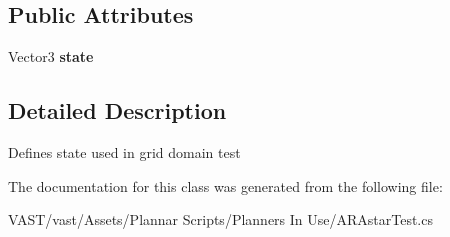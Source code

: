 \subsection*{Public Attributes}
\begin{DoxyCompactItemize}
\item 
\hypertarget{class_a_r_astar_state_ae03c113a1d3d2e42ec3b4ee12a9c0ba8}{Vector3 {\bfseries state}}\label{class_a_r_astar_state_ae03c113a1d3d2e42ec3b4ee12a9c0ba8}

\end{DoxyCompactItemize}


\subsection{Detailed Description}
Defines state used in grid domain test 

The documentation for this class was generated from the following file\-:\begin{DoxyCompactItemize}
\item 
V\-A\-S\-T/vast/\-Assets/\-Plannar Scripts/\-Planners In Use/A\-R\-Astar\-Test.\-cs\end{DoxyCompactItemize}
